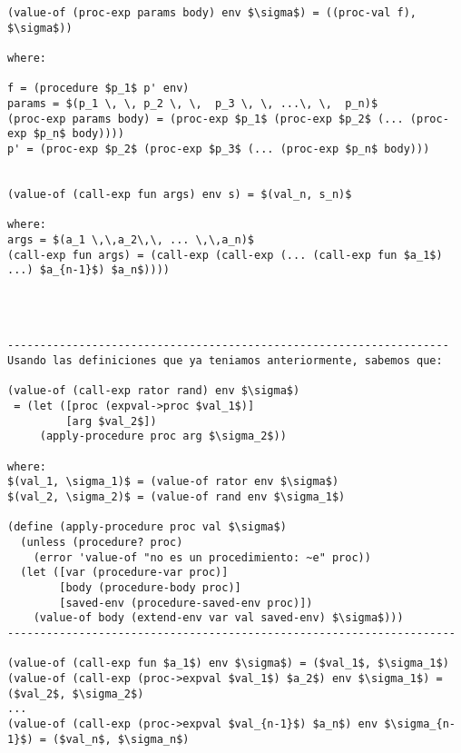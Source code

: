 \documentclass[11pt]{article}
\begin{document}
\begin{lstlisting}[mathescape]
(value-of (proc-exp params body) env $\sigma$) = ((proc-val f), $\sigma$))

where:

f = (procedure $p_1$ p' env)
params = $(p_1 \, \, p_2 \, \,  p_3 \, \, ...\, \,  p_n)$
(proc-exp params body) = (proc-exp $p_1$ (proc-exp $p_2$ (... (proc-exp $p_n$ body))))
p' = (proc-exp $p_2$ (proc-exp $p_3$ (... (proc-exp $p_n$ body)))


(value-of (call-exp fun args) env s) = $(val_n, s_n)$

where:
args = $(a_1 \,\,a_2\,\, ... \,\,a_n)$
(call-exp fun args) = (call-exp (call-exp (... (call-exp fun $a_1$) ...) $a_{n-1}$) $a_n$)))) 




--------------------------------------------------------------------
Usando las definiciones que ya teniamos anteriormente, sabemos que: 

(value-of (call-exp rator rand) env $\sigma$)
 = (let ([proc (expval->proc $val_1$)]
         [arg $val_2$])
     (apply-procedure proc arg $\sigma_2$)) 
     
where:
$(val_1, \sigma_1)$ = (value-of rator env $\sigma$)
$(val_2, \sigma_2)$ = (value-of rand env $\sigma_1$)

(define (apply-procedure proc val $\sigma$)
  (unless (procedure? proc)
    (error 'value-of "no es un procedimiento: ~e" proc))
  (let ([var (procedure-var proc)]
        [body (procedure-body proc)]
        [saved-env (procedure-saved-env proc)])
    (value-of body (extend-env var val saved-env) $\sigma$)))
---------------------------------------------------------------------

(value-of (call-exp fun $a_1$) env $\sigma$) = ($val_1$, $\sigma_1$)
(value-of (call-exp (proc->expval $val_1$) $a_2$) env $\sigma_1$) = ($val_2$, $\sigma_2$)
...
(value-of (call-exp (proc->expval $val_{n-1}$) $a_n$) env $\sigma_{n-1}$) = ($val_n$, $\sigma_n$)

\end{lstlisting}
\end{document}
